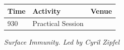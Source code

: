 \documentclass[12pt,]{book}
\begin{document}
\begin{longtable}[]{@{}lll@{}}
\toprule
\begin{minipage}[b]{0.09\columnwidth}\raggedright\strut
Time\strut
\end{minipage} & \begin{minipage}[b]{0.23\columnwidth}\raggedright\strut
Activity\strut
\end{minipage} & \begin{minipage}[b]{0.09\columnwidth}\raggedright\strut
Venue\strut
\end{minipage}\tabularnewline
\midrule
\endhead
\begin{minipage}[t]{0.09\columnwidth}\raggedright\strut
930\strut
\end{minipage} & \begin{minipage}[t]{0.23\columnwidth}\raggedright\strut
Practical Session\strut
\end{minipage} & \begin{minipage}[t]{0.09\columnwidth}\raggedright\strut
\strut
\end{minipage}\tabularnewline
\bottomrule
\end{longtable}

\emph{Surface Immunity. Led by Cyril Zipfel}
\end{document}
